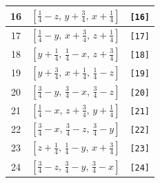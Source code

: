 \documentclass[fleqn,8pt]{jsarticle}
\begin{document}
\begin{longtable}{ccc}
16 & $\left[ \frac{1}{4} - z,\, y + \frac{3}{4},\, x + \frac{1}{4} \right]$ & {\tt [16]} \\ \hline
17 & $\left[ \frac{1}{4} - y,\, x + \frac{3}{4},\, z + \frac{1}{4} \right]$ & {\tt [17]} \\ \hline
18 & $\left[ y + \frac{1}{4},\, \frac{1}{4} - x,\, z + \frac{3}{4} \right]$ & {\tt [18]} \\ \hline
19 & $\left[ y + \frac{3}{4},\, x + \frac{1}{4},\, \frac{1}{4} - z \right]$ & {\tt [19]} \\ \hline
20 & $\left[ \frac{3}{4} - y,\, \frac{3}{4} - x,\, \frac{3}{4} - z \right]$ & {\tt [20]} \\ \hline
21 & $\left[ \frac{1}{4} - x,\, z + \frac{3}{4},\, y + \frac{1}{4} \right]$ & {\tt [21]} \\ \hline
22 & $\left[ \frac{3}{4} - x,\, \frac{3}{4} - z,\, \frac{3}{4} - y \right]$ & {\tt [22]} \\ \hline
23 & $\left[ z + \frac{1}{4},\, \frac{1}{4} - y,\, x + \frac{3}{4} \right]$ & {\tt [23]} \\ \hline
24 & $\left[ \frac{3}{4} - z,\, \frac{3}{4} - y,\, \frac{3}{4} - x \right]$ & {\tt [24]} \\
\end{longtable}
\end{document}
